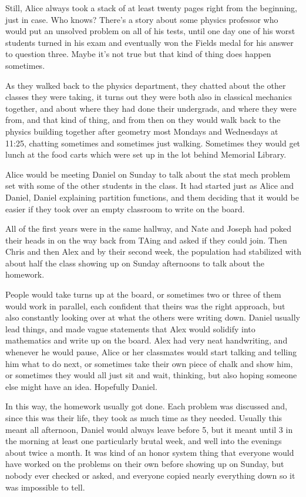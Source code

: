 Still, Alice always took a stack of at least twenty pages right from the beginning, just in case. Who knows? There's a story about some physics professor who would put an unsolved problem on all of his tests, until one day one of his worst students turned in his exam and eventually won the Fields medal for his answer to question three. Maybe it's not true but that kind of thing does happen sometimes. 

As they walked back to the physics department, they chatted about the other classes they were taking, it turns out they were both also in classical mechanics together, and about where they had done their undergrads, and where they were from, and that kind of thing, and from then on they would walk back to the physics building together after geometry most Mondays and Wednesdays at 11:25, chatting sometimes and sometimes just walking. Sometimes they would get lunch at the food carts which were set up in the lot behind Memorial Library. 

\mypause

Alice would be meeting Daniel on Sunday to talk about the stat mech problem set with some of the other students in the class. It had started just as Alice and Daniel, Daniel explaining partition functions, and them deciding that it would be easier if they took over an empty classroom to write on the board.

All of the first years were in the same hallway, and Nate and Joseph had poked their heads in on the way back from TAing and asked if they could join. Then Chris and then Alex and by their second week, the population had stabilized with about half the class showing up on Sunday afternoons to talk about the homework.

People would take turns up at the board, or sometimes two or three of them would work in parallel, each confident that theirs was the right approach, but also constantly looking over at what the others were writing down. Daniel usually lead things, and made vague statements that Alex would solidify into mathematics and write up on the board. Alex had very neat handwriting, and whenever he would pause, Alice or her classmates would start talking and telling him what to do next, or sometimes take their own piece of chalk and show him, or sometimes they would all just sit and wait, thinking, but also hoping someone else might have an idea. Hopefully Daniel.

In this way, the homework usually got done. Each problem was discussed and, since this was their life, they took as much time as they needed. Usually this meant all afternoon, Daniel would always leave before 5, but it meant until 3 in the morning at least one particularly brutal week, and well into the evenings about twice a month. It was kind of an honor system thing that everyone would have worked on the problems on their own before showing up on Sunday, but nobody ever checked or asked, and everyone copied nearly everything down so it was impossible to tell.

